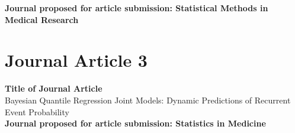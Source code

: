 \documentclass[12pt]{article}
\numberwithin{figure}{section}
\numberwithin{table}{section}
\numberwithin{equation}{section}
\begin{document}
{\bf Journal proposed for article submission: Statistical Methods in Medical Research} \\

\newpage

\begin{bibunit}[apa]





\newpage

\putbib[paper2]
\end{bibunit}

\newpage
\section{Journal Article 3}

{\bf Title of Journal Article}\\
Bayesian Quantile Regression Joint Models: Dynamic Predictions of Recurrent Event Probability\\
{\bf Journal proposed for article submission: Statistics in Medicine} \\


\newpage

\begin{bibunit}[apa]





\newpage

\putbib[paper3]
\end{bibunit}

\newpage


\end{document}
